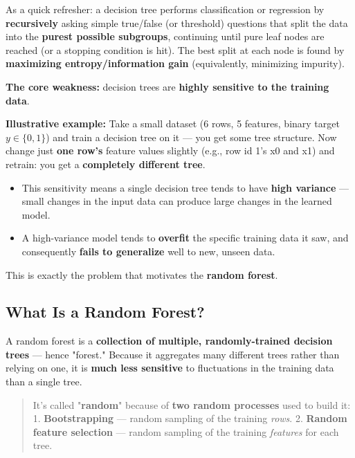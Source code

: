 \documentclass[12pt,openany]{book}
\begin{document}
As a quick refresher: a decision tree performs classification or regression by \textbf{recursively} asking simple true/false (or threshold) questions that split the data into the \textbf{purest possible subgroups}, continuing until pure leaf nodes are reached (or a stopping condition is hit). The best split at each node is found by \textbf{maximizing entropy/information gain} (equivalently, minimizing impurity).

\textbf{The core weakness:} decision trees are \textbf{highly sensitive to the training data}.

\textbf{Illustrative example:} Take a small dataset (6 rows, 5 features, binary target \(y \in \{0,1\}\)) and train a decision tree on it --- you get some tree structure. Now change just \textbf{one row's} feature values slightly (e.g., row id 1's x0 and x1) and retrain: you get a \textbf{completely different tree}.

\begin{itemize}[leftmargin=*]
    \item This sensitivity means a single decision tree tends to have \textbf{high variance} --- small changes in the input data can produce large changes in the learned model.
    \item A high-variance model tends to \textbf{overfit} the specific training data it saw, and consequently \textbf{fails to generalize} well to new, unseen data.

\end{itemize}

This is exactly the problem that motivates the \textbf{random forest}.

\medskip


\subsection{What Is a Random Forest?}


A random forest is a \textbf{collection of multiple, randomly-trained decision trees} --- hence "forest." Because it aggregates many different trees rather than relying on one, it is \textbf{much less sensitive} to fluctuations in the training data than a single tree.

\begin{quote}
It's called "\textbf{random}" because of \textbf{two random processes} used to build it:
1. \textbf{Bootstrapping} --- random sampling of the training \textit{rows}.
2. \textbf{Random feature selection} --- random sampling of the training \textit{features} for each tree.
\end{quote}
\end{document}

